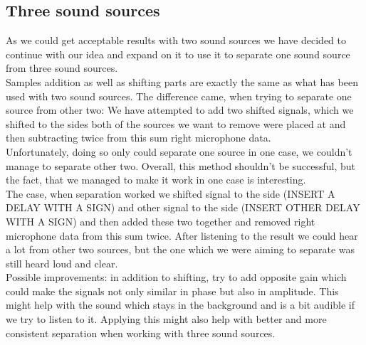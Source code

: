 \subsection*{Three sound sources} 
As we could get acceptable results with two sound sources we have decided to continue with 
our idea and expand on it to use it to separate one sound source from three sound sources.
\\
Samples addition as well as shifting parts are exactly the same as what has been used with 
two sound sources. The difference came, when trying to separate one source from other two: 
We have attempted to add two shifted signals, which we shifted to the sides both of the 
sources we want to remove were placed at and then subtracting twice from this sum right 
microphone data. \\
Unfortunately, doing so only could separate one source in one case, we couldn't manage to 
separate other two. Overall, this method shouldn't be successful, but the fact, that we 
managed to make it work in one case is interesting.  \\
The case, when separation worked we shifted signal to the side (INSERT A DELAY WITH A 
SIGN) and other signal to the side (INSERT OTHER DELAY WITH A SIGN) and then added these 
two together and removed right microphone data from this sum twice. After listening to the 
result we could hear a lot from other two sources, but the one which we were aiming to 
separate was still heard loud and clear.\\
Possible improvements: in addition to shifting, try to add opposite gain which could make 
the signals not only similar in phase but also in amplitude. This might help with the 
sound which stays in the background and is a bit audible if we try to listen to it. 
Applying this might also help with better and more consistent separation when working with 
three sound sources. 

